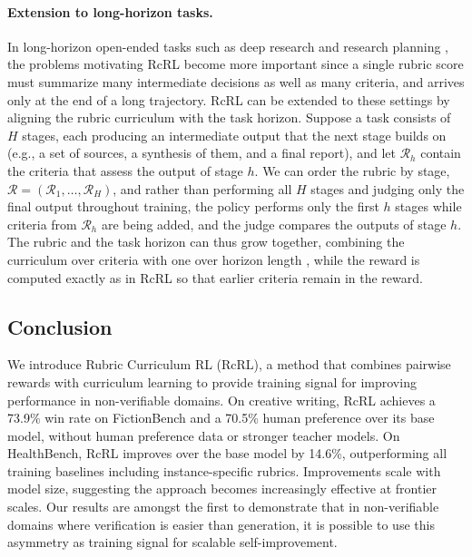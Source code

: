 \documentclass{article}
\theoremstyle{plain}
\theoremstyle{definition}
\theoremstyle{remark}
\begin{document}
\paragraph{Extension to long-horizon tasks.}
In long-horizon open-ended tasks such as deep research \citep{shao2026drtulureinforcementlearning} and research planning \citep{goel2025trainingaicoscientistsusing}, the problems motivating RcRL become more important since a single rubric score must summarize many intermediate decisions as well as many criteria, and arrives only at the end of a long trajectory. RcRL can be extended to these settings by aligning the rubric curriculum with the task horizon. Suppose a task consists of $H$ stages, each producing an intermediate output that the next stage builds on (e.g., a set of sources, a synthesis of them, and a final report), and let $\mathcal{R}_h$ contain the criteria that assess the output of stage $h$. We can order the rubric by stage, $\mathcal{R} = (\mathcal{R}_1,\ldots,\mathcal{R}_H)$, and rather than performing all $H$ stages and judging only the final output throughout training, the policy performs only the first $h$ stages while criteria from $\mathcal{R}_h$ are being added, and the judge compares the outputs of stage $h$. The rubric and the task horizon can thus grow together, combining the curriculum over criteria with one over horizon length \citep{h1paper}, while the reward is computed exactly as in RcRL so that earlier criteria remain in the reward.


\subsection{Conclusion}
We introduce Rubric Curriculum RL (RcRL), a method that combines pairwise rewards with curriculum learning to provide training signal for improving performance in non-verifiable domains. On creative writing, RcRL achieves a 73.9\% win rate on FictionBench and a 70.5\% human preference over its base model, without human preference data or stronger teacher models. On HealthBench, RcRL improves over the base model by 14.6\%, outperforming all training baselines including instance-specific rubrics. Improvements scale with model size, suggesting the approach becomes increasingly effective at frontier scales. Our results are amongst the first to demonstrate that in non-verifiable domains where verification is easier than generation, it is possible to use this asymmetry as training signal for scalable self-improvement.
\end{document}
